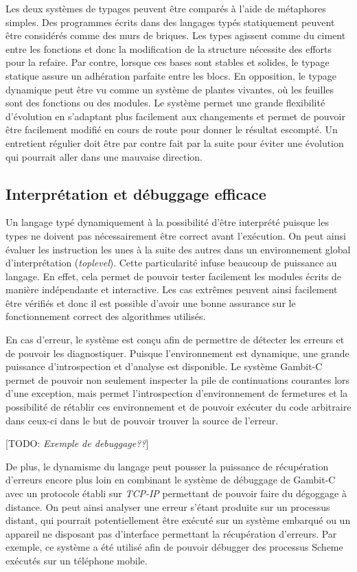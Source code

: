 \documentclass[12pt,oneside,letterpaper,francais]{book}
\newcommand{\todo}[1]{[TODO: {\it #1}]}
\begin{document}
Les deux systèmes de typages peuvent être comparés à l'aide de
métaphores simples. Des programmes écrits dans des langages typés
statiquement peuvent être considérés comme des murs de briques. Les
types agissent comme du ciment entre les fonctions et donc la
modification de la structure nécessite des efforts pour la
refaire. Par contre, lorsque ces bases sont stables et solides, le
typage statique assure un adhération parfaite entre les blocs.  En
opposition, le typage dynamique peut être vu comme un système de
plantes vivantes, où les feuilles sont des fonctions ou des
modules. Le système permet une grande flexibilité d'évolution en
s'adaptant plus facilement aux changements et permet de pouvoir être
facilement modifié en cours de route pour donner le résultat
escompté. Un entretient régulier doit être par contre fait par la
suite pour éviter une évolution qui pourrait aller dans une mauvaise
direction.


\subsection{Interprétation et débuggage efficace}

Un langage typé dynamiquement à la possibilité d'être interprété
puisque les types ne doivent pas nécessairement être correct avant
l'exécution. On peut ainsi évaluer les instruction les unes à la suite
des autres dans un environnement global d'interprétation
(\textit{toplevel}). Cette particularité infuse beaucoup de puissance
au langage. En effet, cela permet de pouvoir tester facilement les
modules écrits de manière indépendante et interactive. Les cas
extrêmes peuvent ainsi facilement être vérifiés et donc il est
possible d'avoir une bonne assurance sur le fonctionnement correct des
algorithmes utilisés.

En cas d'erreur, le système est conçu afin de permettre de détecter
les erreurs et de pouvoir les diagnostiquer. Puisque l'environnement
est dynamique, une grande puissance d'introspection et d'analyse est
disponible. Le système Gambit-C permet de pouvoir non seulement
inspecter la pile de continuations courantes lors d'une exception,
mais permet l'introspection d'environnement de fermetures et la
possibilité de rétablir ces environnement et de pouvoir exécuter du
code arbitraire dans ceux-ci dans le but de pouvoir trouver la source
de l'erreur.

\todo{Exemple de debuggage??}

De plus, le dynamisme du langage peut pousser la puissance de
récupération d'erreurs encore plus loin en combinant le système de
débuggage de Gambit-C avec un protocole établi sur \textit{TCP-IP}
permettant de pouvoir faire du dégoggage à distance. On peut ainsi
analyser une erreur s'étant produite sur un processus distant, qui
pourrait potentiellement être exécuté sur un système embarqué ou un
appareil ne disposant pas d'interface permettant la récupération
d'erreurs. Par exemple, ce système a été utilisé afin de pouvoir
débugger des processus Scheme exécutés sur un téléphone mobile.
\end{document}
